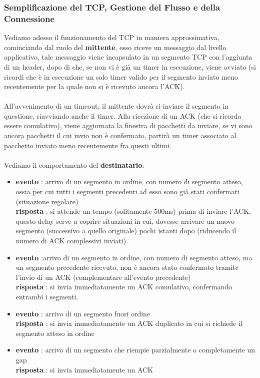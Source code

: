 \documentclass[12pt, letterpaper]{article}
\newcommand{\acc}{\\\hphantom{}\\}
\begin{document}
\subsubsection{Semplificazione del TCP, Gestione del Flusso e della Connessione}
Vediamo adesso il funzionamento del TCP in maniera approssimativa, cominciando dal ruolo del \textbf{mittente}, 
esso riceve un messaggio dal livello applicativo, tale messaggio viene incapsulato in un segmento TCP con 
l'aggiunta di un header, dopo di che, se non vi è già un timer in esecuzione, viene avviato (si ricordi che 
è in esecuzione un solo timer valido per il segmento inviato meno recentemente per la quale non si è ricevuto 
ancora l'ACK).\acc 
All'avvenimento di un timeout, il mittente dovrà ri-inviare il segmento in questione, riavviando anche il timer. 
Alla ricezione di un ACK (che si ricorda essere comulativo), viene aggiornata la finestra di pacchetti 
da inviare, se vi sono ancora pacchetti il cui invio non è confermato, partirà un timer associato al pacchetto 
inviato meno recentemente fra questi ultimi.\acc Vediamo il comportamento del \textbf{destinatario}:\begin{itemize}
    \item \textbf{evento} : arrivo di un segmento in ordine,
    con numero di segmento atteso, 
   ossia per cui tutti i segmenti precedenti  ad esso sono 
   già stati confermati  (situazione regolare) \\ \textbf{risposta} : si attende un tempo (solitamente 500ms) prima 
   di inviare l'ACK, questo delay serve a coprire 
   situazioni in cui, dovesse arrivare un nuovo segmento (successivo a
    quello originale)  pochi istanti dopo (riducendo il numero di ACK
    complessivi inviati).
    \item \textbf{evento} :arrivo di un segmento in ordine, con numero
    di segmento atteso,  ma un segmento precedente ricevuto,
    non è ancora stato confermato 
   tramite l'invio di un ACK (complementare
    all'evento precedente)\\
    \textbf{risposta} : si invia immediatamente un ACK comulativo,
    confermando entrambi i segmenti.
    \item \textbf{evento} : arrivo di un segmento fuori ordine\\
    \textbf{risposta} : si invia immediatamente un ACK duplicato in
    cui si richiede il segmento atteso in ordine
    \item \textbf{evento} : arrivo di un segmento che riempie
    parzialmente o completamente un gap\\
    \textbf{risposta} : si invia immediatamente un ACK 
\end{itemize}
\end{document}
